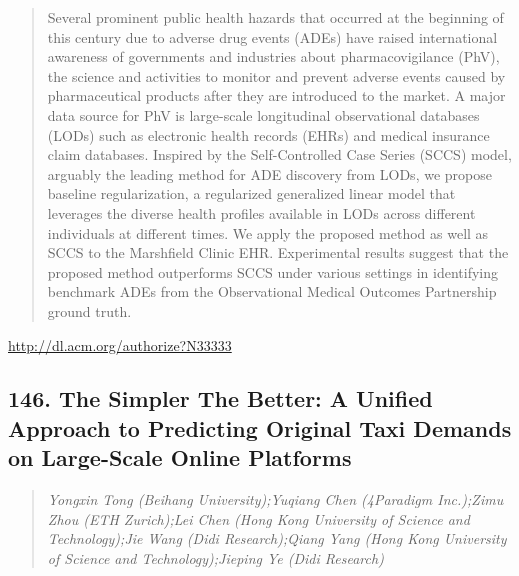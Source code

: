 \documentclass{article}
\begin{document}
\begin{quote}
Several prominent public health hazards that occurred at the beginning of this century due to adverse drug events (ADEs) have raised international awareness of governments and industries about pharmacovigilance (PhV), the science and activities to monitor and prevent adverse events caused by pharmaceutical products after they are introduced to the market. A major data source for PhV is large-scale longitudinal observational databases (LODs) such as electronic health records (EHRs) and medical insurance claim databases. Inspired by the Self-Controlled Case Series (SCCS) model, arguably the leading method for ADE discovery from LODs, we propose baseline regularization, a regularized generalized linear model that leverages the diverse health profiles available in LODs across different individuals at different times. We apply the proposed method as well as SCCS to the Marshfield Clinic EHR. Experimental results suggest that the proposed method outperforms SCCS under various settings in identifying benchmark ADEs from the Observational Medical Outcomes Partnership ground truth.
\end{quote}

\href{http://dl.acm.org/authorize?N33333}{http://dl.acm.org/authorize?N33333}

\subsection{146. The Simpler The Better: A Unified Approach to Predicting Original Taxi Demands on Large-Scale Online Platforms}

\begin{quote}
\footnotesize{\textit{Yongxin Tong (Beihang University);Yuqiang Chen (4Paradigm Inc.);Zimu Zhou (ETH Zurich);Lei Chen (Hong Kong University of Science and Technology);Jie Wang (Didi Research);Qiang Yang (Hong Kong University of Science and Technology);Jieping Ye (Didi Research)}}

\end{quote}
\end{document}
